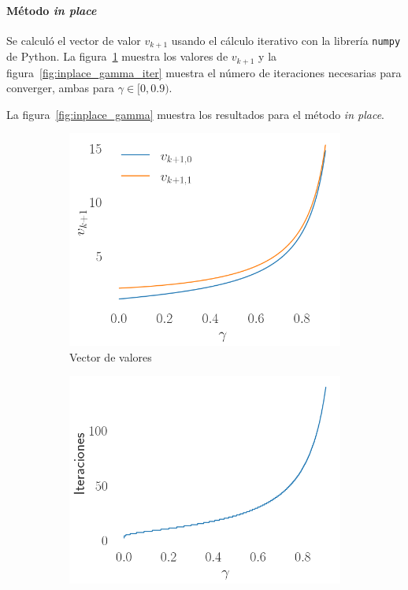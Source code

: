 \paragraph{Método \textit{in place}} Se calculó el vector de valor $v_{k+1}$ usando el cálculo iterativo con la librería \texttt{numpy} de Python\footnotemark.
La figura~\ref{fig:inplace_gamma_vk} muestra los valores de $v_{k+1}$ y la figura~\ref{fig:inplace_gamma_iter} muestra el número de iteraciones necesarias para converger, ambas para $\gamma \in [0, 0.9)$.


La figura~\ref{fig:inplace_gamma} muestra los resultados para el método \textit{in place}.

\begin{figure}[H]
    \centering
    \begin{subfigure}[H]{0.45\textwidth}
        \includegraphics[width=\textwidth]{../img/gamma_v_k}
        \caption{Vector de valores}
        \label{fig:inplace_gamma_vk}
    \end{subfigure}
    \begin{subfigure}[H]{0.45\textwidth}
        \includegraphics[width=\textwidth]{../img/gamma_iters}

\end{subfigure}
\end{figure}

